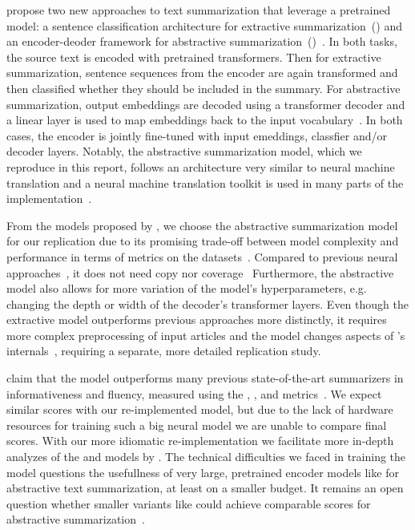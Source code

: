 \citeauthor{LiuL2019} propose two new approaches to text summarization that leverage a pretrained \Bert model: a sentence classification architecture for extractive summarization~(\BertSumExt) and an encoder-deoder framework for abstractive summarization~(\BertSumAbs)~\cite{LiuL2019}.
In both tasks, the source text is encoded with pretrained \Bert transformers. Then for extractive summarization, sentence sequences from the \Bert encoder are again transformed and then classified whether they should be included in the summary.
For abstractive summarization, \Bert output embeddings are decoded using a transformer decoder and a linear layer is used to map embeddings back to the input vocabulary~\cite{LiuL2019}. In both cases, the \Bert encoder is jointly fine-tuned with input emeddings, classfier and/or decoder layers.
Notably, the abstractive summarization model, which we reproduce in this report,
follows an architecture very similar to neural machine translation and a neural machine translation toolkit is used in many parts of the \BertSumAbs implementation~\cite{LiuL2019,KleinKDSR2017}.

From the models proposed by \citeauthor{LiuL2019}, we choose the \BertSumAbs abstractive summarization model for our replication due to its promising trade-off between model complexity and performance in terms of \Rouge metrics on the \CnnDailyMail datasets~\cite{LiuL2019,HermannKGEKSB2015}.
Compared to previous neural approaches~\cite{SeeLM2017,PaulusXS2018}, it does not need copy nor coverage~\cite{LiuL2019}
Furthermore, the abstractive model also allows for more variation of the model's hyperparameters, e.g. changing the depth or width of the decoder's transformer layers. 
Even though the extractive model \BertSumExt outperforms previous approaches more  distinctly, it requires more complex preprocessing of input articles and the model changes aspects of \Bert's internals~\cite{LiuL2019}, requiring a separate, more detailed replication study.

\citeauthor{LiuL2019} claim that the \BertSumAbs model outperforms many previous state-of-the-art summarizers in informativeness and fluency, measured using the , , and \RougeL metrics~\cite{LiuL2019,Lin2004}.
We expect similar scores with our re-implemented model, but due to the lack of hardware resources for training such a big neural model we are unable to compare final \Rouge scores.
With our more idiomatic re-implementation we facilitate more in-depth analyzes of the \BertSumAbs and \TransformerAbs models by \citeauthor{LiuL2019}.
The technical difficulties we faced in training the \BertSumAbs model questions the usefullness of very large, pretrained encoder models like \Bert for abstractive text summarization, at least on a smaller budget. It remains an open question whether smaller variants like \BertTiny could achieve comparable \Rouge scores for abstractive summarization~\cite{TurcCLT2019}.
